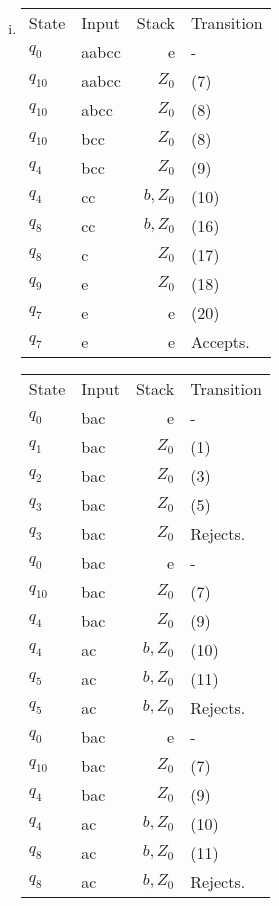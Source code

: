 \documentclass[12pt]{article}
\begin{document}
\begin{enumerate}[(i)]
\item 
\begin{tabular}{|llrl|}
\hline
State & Input & Stack & Transition\\
$q_0$ & aabcc & e     &  - \\
$q_{10}$ & aabcc & $Z_0$ & (7) \\
$q_{10}$ & abcc  & $Z_0$     & (8) \\
$q_{10}$ & bcc   & $Z_0$     & (8) \\
$q_4$ & bcc   & $Z_0$     & (9) \\
$q_4$ & cc   & $b,Z_0$     & (10) \\
$q_8$ & cc   & $b,Z_0$     & (16) \\
$q_8$ & c   & $Z_0$     & (17) \\
$q_9$ & e  & $Z_0$     & (18) \\
$q_7$ & e   & e     & (20) \\
$q_7$ & e   & e     & Accepts. \\

\hline
\end{tabular}
\begin{tabular}{|llrl|}
\hline
State & Input & Stack & Transition \\
$q_0$ & bac & e & - \\
$q_1$ & bac & $Z_0$ & (1) \\
$q_2$ & bac & $Z_0$ & (3) \\
$q_3$ & bac & $Z_0$ & (5) \\
$q_3$ & bac & $Z_0$ & Rejects. \\
\hline
$q_0$ & bac & e & - \\
$q_{10}$ & bac & $Z_0$ & (7) \\
$q_4$ & bac & $Z_0$ & (9) \\
$q_4$ & ac & $b,Z_0$ & (10) \\
$q_5$ & ac & $b,Z_0$ & (11) \\
$q_5$ & ac & $b,Z_0$ & Rejects. \\
\hline
$q_0$ & bac & e & - \\
$q_{10}$ & bac & $Z_0$ & (7) \\
$q_4$ & bac & $Z_0$ & (9) \\
$q_4$ & ac & $b,Z_0$ & (10) \\
$q_8$ & ac & $b,Z_0$ & (11) \\
$q_8$ & ac & $b,Z_0$ & Rejects. \\
\hline
\end{tabular}
\end{enumerate}
\end{document}
